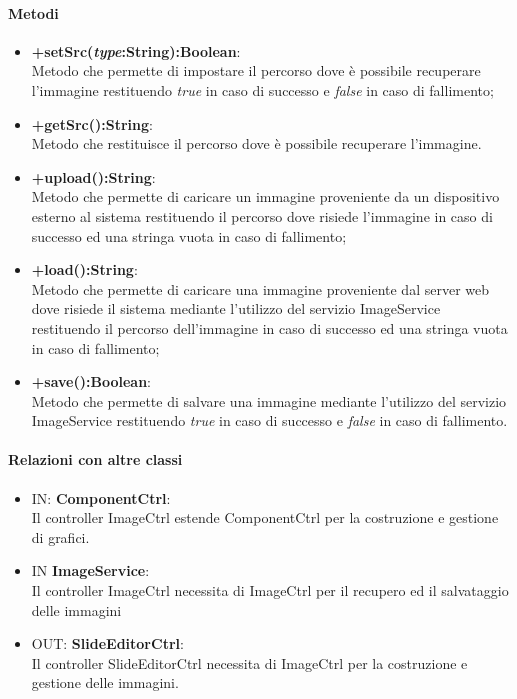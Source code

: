 	\paragraph{Metodi}
	\begin{itemize}
	\item \textbf{+setSrc(\textit{type}:String):Boolean}:\\
		Metodo che permette di impostare il percorso dove è possibile recuperare l'immagine restituendo \textit{true} in caso di successo e \textit{false} in caso di fallimento;
	\item \textbf{+getSrc():String}:\\
		Metodo che restituisce il percorso dove è possibile recuperare l'immagine.
	\item \textbf{+upload():String}:\\	
		Metodo che permette di caricare un immagine proveniente da un dispositivo esterno al sistema restituendo il percorso dove risiede l'immagine in caso di successo ed una stringa vuota in caso di fallimento;
	\item \textbf{+load():String}:\\	
		Metodo che permette di caricare una immagine proveniente dal server web dove risiede il sistema mediante l'utilizzo del servizio ImageService restituendo il percorso dell'immagine in caso di successo ed una stringa vuota in caso di fallimento;
	\item \textbf{+save():Boolean}:\\	
		Metodo che permette di salvare una immagine mediante l'utilizzo del servizio ImageService restituendo \textit{true} in caso di successo e \textit{false} in caso di fallimento.
	\end{itemize}
	\paragraph{Relazioni con altre classi}
	\begin{itemize}
 	\item IN: \textbf{ComponentCtrl}:\\
	 	Il controller ImageCtrl estende ComponentCtrl per la costruzione e gestione di grafici.
	\item IN \textbf{ImageService}:\\
		Il controller ImageCtrl necessita di ImageCtrl per il recupero ed il salvataggio delle immagini
	\item OUT: \textbf{SlideEditorCtrl}:\\
		Il controller SlideEditorCtrl necessita di ImageCtrl per la costruzione e gestione delle immagini. 	
	\end{itemize}

